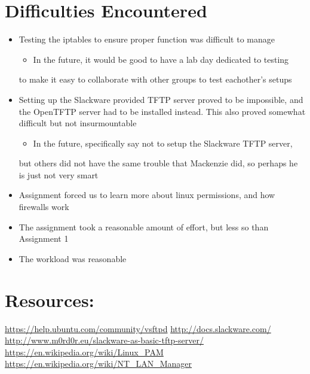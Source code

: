 \documentclass[11pt]{article}
\begin{document}
\section{Difficulties Encountered}
\label{sec-6}
\begin{itemize}
\item Testing the iptables to ensure proper function was difficult to manage
\begin{itemize}
\item In the future, it would be good to have a lab day dedicated to testing
\end{itemize}
to make it easy to collaborate with other groups to test eachother's
setups
\item Setting up the Slackware provided TFTP server proved to be impossible, and
the OpenTFTP server had to be installed instead. This also proved somewhat
difficult but not insurmountable
\begin{itemize}
\item In the future, specifically say not to setup the Slackware TFTP server,
\end{itemize}
but others did not have the same trouble that Mackenzie did, so perhaps
he is just not very smart
\item Assignment forced us to learn more about linux permissions, and how
firewalls work
\item The assignment took a reasonable amount of effort, but less so than
Assignment 1
\item The workload was reasonable
\end{itemize}

\section{Resources:}
\label{sec-7}
\url{https://help.ubuntu.com/community/vsftpd}
\url{http://docs.slackware.com/}
\url{http://www.m0rd0r.eu/slackware-as-basic-tftp-server/}
\url{https://en.wikipedia.org/wiki/Linux_PAM}
\url{https://en.wikipedia.org/wiki/NT_LAN_Manager}
\end{document}
